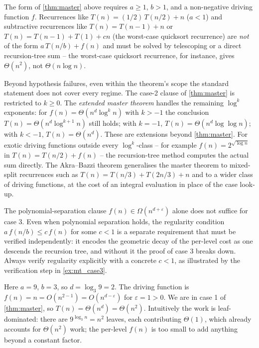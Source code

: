 \begin{remark}
\label{rem:master_gaps}
The form of \cref{thm:master} above requires $a \ge 1$, $b > 1$, and a non-negative driving function $f$. Recurrences like $T(n) = (1/2)\,T(n/2) + n$ ($a < 1$) and subtractive recurrences like $T(n) = T(n-1) + n$ or $T(n) = T(n-1) + T(1) + cn$ (the worst-case quicksort recurrence) are \emph{not} of the form $a\,T(n/b) + f(n)$ and must be solved by telescoping or a direct recursion-tree sum -- the worst-case quicksort recurrence, for instance, gives $\Theta(n^2)$, not $\Theta(n \log n)$.

Beyond hypothesis failures, even within the theorem's scope the standard statement does not cover every regime. The case-2 clause of \cref{thm:master} is restricted to $k \ge 0$. The \emph{extended master theorem} handles the remaining $\log^k$ exponents: for $f(n) = \Theta(n^d \log^k n)$ with $k > -1$ the conclusion $T(n) = \Theta(n^d \log^{k+1} n)$ still holds; with $k = -1$, $T(n) = \Theta(n^d \log\log n)$; with $k < -1$, $T(n) = \Theta(n^d)$. These are extensions beyond \cref{thm:master}. For exotic driving functions outside every $\log^k$-class -- for example $f(n) = 2^{\sqrt{\log n}}$ in $T(n) = T(n/2) + f(n)$ -- the recursion-tree method computes the actual sum directly. The Akra--Bazzi theorem generalises the master theorem to mixed-split recurrences such as $T(n) = T(n/3) + T(2n/3) + n$ and to a wider class of driving functions, at the cost of an integral evaluation in place of the case look-up.
\end{remark}

\begin{remark}
\label{rem:master_regularity}
The polynomial-separation clause $f(n) \in \Omega(n^{d+\varepsilon})$ alone does not suffice for case 3. Even when polynomial separation holds, the regularity condition $a\,f(n/b) \le c\,f(n)$ for some $c < 1$ is a separate requirement that must be verified independently: it encodes the geometric decay of the per-level cost as one descends the recursion tree, and without it the proof of case 3 breaks down. Always verify regularity explicitly with a concrete $c < 1$, as illustrated by the verification step in \cref{ex:mt_case3}.
\end{remark}

\begin{example}[Master theorem case 1: $T(n) = 9T(n/3) + n$]
\label{ex:mt_case1}
Here $a = 9$, $b = 3$, so $d = \log_3 9 = 2$. The driving function is $f(n) = n = O(n^{2 - 1}) = O(n^{d - \varepsilon})$ for $\varepsilon = 1 > 0$. We are in case 1 of \cref{thm:master}, so $T(n) = \Theta(n^d) = \Theta(n^2)$. Intuitively the work is leaf-dominated: there are $9^{\log_3 n} = n^2$ leaves, each contributing $\Theta(1)$, which already accounts for $\Theta(n^2)$ work; the per-level $f(n)$ is too small to add anything beyond a constant factor.
\end{example}

